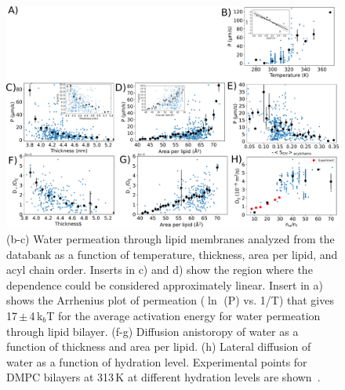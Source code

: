\documentclass[fleqn,10pt]{wlscirep}
\begin{document}
\begin{figure}[tbp]
    \centering
    \includegraphics[width=180mm]{Figures/permeation2.pdf}
    \caption{(b-c) Water permeation through lipid membranes analyzed from the databank as a function of temperature, thickness, area per lipid, and acyl chain order. 
      Inserts in c) and d) show the region where the dependence could be considered approximately linear.
      Insert in a) shows the Arrhenius plot of permeation ($\ln$ (P) vs. 1/T) that gives 17\,$\pm$\,4\,k$_b$T for the average activation energy for water permeation through lipid bilayer.
      (f-g) Diffusion anistoropy of water as a function of thickness and area per lipid.
      (h) Lateral diffusion of water as a function of hydration level. Experimental points for DMPC bilayers at 313\,K at different hydration levels are shown~\cite{rudakova04}.}
    \label{fig:permeability}
\end{figure}
\end{document}
